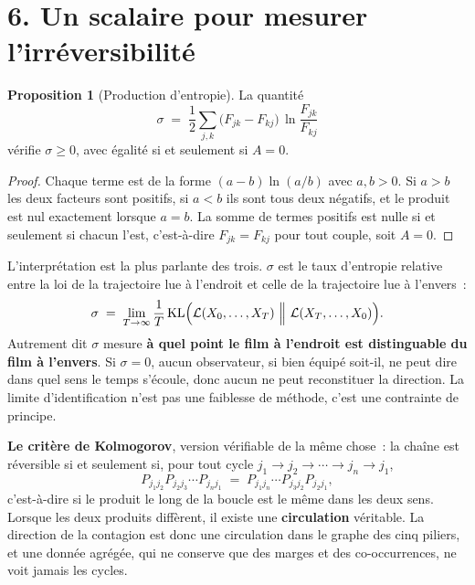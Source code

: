 \documentclass[11pt,a4paper]{article}
\theoremstyle{definition}
\newtheorem{proposition}{Proposition}
\begin{document}
\section*{6. Un scalaire pour mesurer l'irréversibilité}

\begin{proposition}[Production d'entropie]\label{prop:entropie}
La quantité
\begin{equation}
  \sigma\;=\;\frac12\sum_{j,k}\bigl(F_{jk}-F_{kj}\bigr)\,
  \ln\!\frac{F_{jk}}{F_{kj}}
  \label{eq:entropie}
\end{equation}
vérifie $\sigma\ge 0$, avec égalité si et seulement si $A=0$.
\end{proposition}

\begin{proof}
Chaque terme est de la forme $(a-b)\ln(a/b)$ avec $a,b>0$. Si $a>b$ les deux facteurs sont
positifs, si $a<b$ ils sont tous deux négatifs, et le produit est nul exactement lorsque
$a=b$. La somme de termes positifs est nulle si et seulement si chacun l'est, c'est-à-dire
$F_{jk}=F_{kj}$ pour tout couple, soit $A=0$.
\end{proof}

L'interprétation est la plus parlante des trois. $\sigma$ est le taux d'entropie relative
entre la loi de la trajectoire lue à l'endroit et celle de la trajectoire lue à l'envers~:
\begin{equation}
  \sigma\;=\;\lim_{T\to\infty}\frac1T\,
  \mathrm{KL}\Bigl(\mathcal{L}(X_0,\dots,X_T)\ \Big\|\ \mathcal{L}(X_T,\dots,X_0)\Bigr).
  \label{eq:kl}
\end{equation}
Autrement dit $\sigma$ mesure \textbf{à quel point le film à l'endroit est distinguable du
film à l'envers}. Si $\sigma=0$, aucun observateur, si bien équipé soit-il, ne peut dire
dans quel sens le temps s'écoule, donc aucun ne peut reconstituer la direction. La limite
d'identification n'est pas une faiblesse de méthode, c'est une contrainte de principe.

\medskip
\noindent\textbf{Le critère de Kolmogorov}, version vérifiable de la même chose~: la chaîne
est réversible si et seulement si, pour tout cycle $j_1\to j_2\to\cdots\to j_n\to j_1$,
\begin{equation}
  P_{j_1j_2}P_{j_2j_3}\cdots P_{j_nj_1}
  \;=\;
  P_{j_1j_n}\cdots P_{j_3j_2}P_{j_2j_1},
  \label{eq:kolmogorov}
\end{equation}
c'est-à-dire si le produit le long de la boucle est le même dans les deux sens. Lorsque les
deux produits diffèrent, il existe une \textbf{circulation} véritable. La direction de la
contagion est donc une circulation dans le graphe des cinq piliers, et une donnée agrégée,
qui ne conserve que des marges et des co-occurrences, ne voit jamais les cycles.
\end{document}

